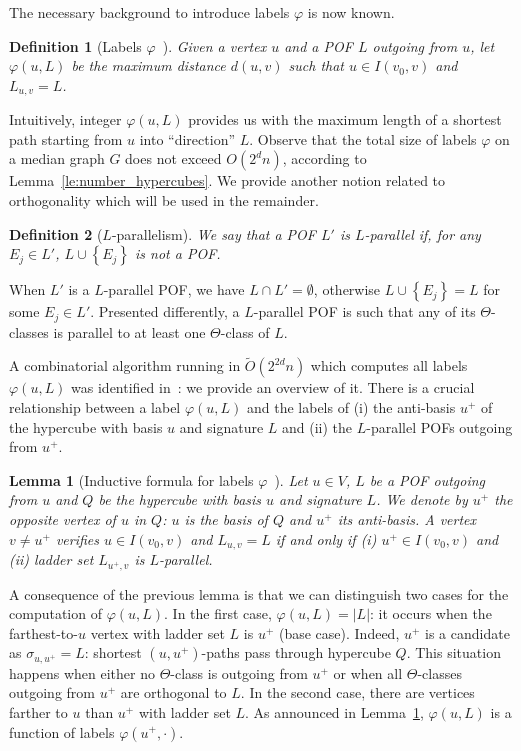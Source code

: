 \documentclass{article}
\newtheorem{definition}{Definition}
\newtheorem{lemma}{Lemma}
\newcommand{\set}[1]{\left\{ #1 \right\}}
\newcommand{\card}[1]{\left| #1 \right|}
\begin{document}
The necessary background to introduce labels $\varphi$ is now known.

\begin{definition}[Labels $\varphi$~\cite{BeHa21}]
Given a vertex $u$ and a POF $L$ outgoing from $u$, let $\varphi(u,L)$ be the maximum distance $d(u,v)$ such that $u \in I(v_0,v)$ and $L_{u,v} = L$.
\label{def:varphi}
\end{definition}

Intuitively, integer $\varphi(u,L)$ provides us with the maximum length of a shortest path starting from $u$ into ``direction'' $L$. Observe that the total size of labels $\varphi$ on a median graph $G$ does not exceed $O(2^dn)$, according to Lemma~\ref{le:number_hypercubes}. We provide another notion related to orthogonality which will be used in the remainder.

\begin{definition}[$L$-parallelism]
We say that a POF $L'$ is $L$-\emph{parallel} if, for any $E_j \in L'$, $L \cup \set{E_j}$ is not a POF.
\label{def:pof_parallel}
\end{definition}

When $L'$ is a $L$-parallel POF, we have $L \cap L' = \emptyset$, otherwise $L \cup \set{E_j} = L$ for some $E_j \in L'$. Presented differently, a $L$-parallel POF is such that any of its $\Theta$-classes is parallel to at least one $\Theta$-class of $L$.

A combinatorial algorithm running in $\tilde{O}(2^{2d}n)$ which computes all labels $\varphi(u,L)$ was identified in~\cite{BeHa21}: we provide an overview of it. There is a crucial relationship between a label $\varphi(u,L)$ and the labels of (i) the anti-basis $u^+$ of the hypercube with basis $u$ and signature $L$ and (ii) the $L$-parallel POFs outgoing from $u^+$.

\begin{lemma}[Inductive formula for labels $\varphi$~\cite{BeHa21}]
Let $u \in V$, $L$ be a POF outgoing from $u$ and $Q$ be the hypercube with basis $u$ and signature $L$. We denote by $u^+$ the opposite vertex of $u$ in $Q$: $u$ is the basis of $Q$ and $u^+$ its anti-basis. A vertex $v\neq u^+$ verifies $u \in I(v_0,v)$ and $L_{u,v} = L$ if and only if (i) $u^+ \in I(v_0,v)$ and (ii) ladder set $L_{u^+,v}$ is $L$-parallel.
\label{le:pushing_phi}
\end{lemma}

A consequence of the previous lemma is that we can distinguish two cases for the computation of $\varphi(u,L)$. In the first case, $\varphi(u,L) = \card{L}$: it occurs when the farthest-to-$u$ vertex with ladder set $L$ is $u^+$ (base case). Indeed, $u^+$ is a candidate as $\sigma_{u,u^+} = L$: shortest $(u,u^+)$-paths pass through hypercube $Q$. This situation happens when either no $\Theta$-class is outgoing from $u^+$ or when all $\Theta$-classes outgoing from $u^+$ are orthogonal to $L$. In the second case, there are vertices farther to $u$ than $u^+$ with ladder set $L$. As announced in Lemma~\ref{le:pushing_phi}, $\varphi(u,L)$ is a function of labels $\varphi(u^+,\cdot)$.
\end{document}
